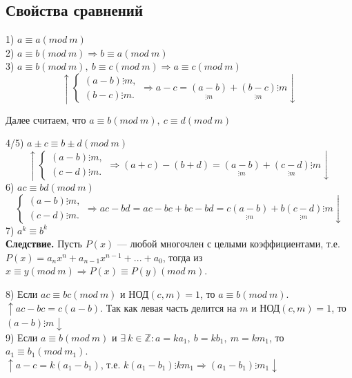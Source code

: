 \documentclass{article}
\begin{document}
    \subsection{Свойства сравнений}
    1) \( a \equiv a (mod\ m) \)\\
    2) \( a \equiv b (mod\ m) \Rightarrow b \equiv a (mod\ m) \)\\
    3) \( a \equiv b (mod\ m),\ b \equiv c (mod\ m) \Rightarrow a \equiv c (mod\ m) \)
    \[ \uparrow
        \begin{cases}
            (a - b) \vdots m,\\
            (b - c) \vdots m.
        \end{cases} \Rightarrow a - c = \underset{\vdots m}{(a - b)} + \underset{\vdots m}{(b - c)} \vdots m \downarrow \]
    \centerline{Далее считаем, что \( a \equiv b (mod\ m),\ c \equiv d (mod\ m) \)}
    4/5) \( a \pm c \equiv b \pm d (mod\ m) \)
    \[ \uparrow
        \begin{cases}
            (a - b) \vdots m,\\
            (c - d) \vdots m.
        \end{cases}
    \Rightarrow (a + c) - (b + d) = \underset{\vdots m}{(a - b)} + \underset{\vdots m}{(c - d)} \vdots m \downarrow \]
    6) \( ac \equiv bd (mod\ m) \) 
    \[ 
        \begin{cases}
            (a - b) \vdots m,\\
            (c - d) \vdots m.
        \end{cases}
    \Rightarrow ac - bd = ac - bc + bc - bd = c\underset{\vdots m}{(a - b)} + b\underset{\vdots m}{(c - d)} \vdots m \downarrow \]
    7) \( a^k \equiv b^k \)\\
    \textbf{Следствие.} Пусть \(P(x)\) --- любой многочлен с целыми коэффициентами, т.е. \(P(x) = a_nx^n + a_{n - 1}x^{n - 1} + ... + a_0\), тогда из \(x \equiv y (mod\ m) \Rightarrow P(x) \equiv P(y) (mod\ m)\).

    8) Если \(ac \equiv bc (mod\ m)\) и \(\textrm{НОД}(c,m) = 1\), то \(a \equiv b (mod\ m)\).\\
    \(\uparrow ac - bc = c(a - b)\). Так как левая часть делится на \(m\) и \(\textrm{НОД}(c,m) = 1\), то \((a - b) \vdots m \downarrow \)\\
    9) Если \(a \equiv b (mod\ m)\) и \(\exists\ k \in \mathbb{Z}: a = ka_1,\ b = kb_1,\ m = km_1\), то \(a_1 \equiv b_1 (mod\ m_1)\).\\
    \( \uparrow a - c = k(a_1 - b_1) \), т.е. \( k(a_1 - b_1) \vdots km_1 \Rightarrow (a_1 - b_1) \vdots m_1 \downarrow \)
\end{document}
